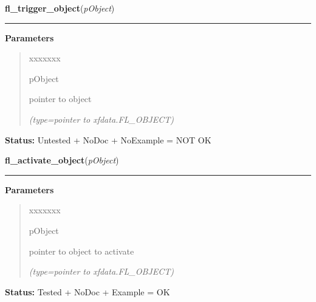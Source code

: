 \hspace{.8\funcindent}\begin{boxedminipage}{\funcwidth}

    \raggedright \textbf{fl\_trigger\_object}(\textit{pObject})

    \vspace{-1.5ex}

    \rule{\textwidth}{0.5\fboxrule}
\setlength{\parskip}{2ex}
\setlength{\parskip}{1ex}
      \textbf{Parameters}
      \vspace{-1ex}

      \begin{quote}
        \begin{Ventry}{xxxxxxx}

          \item[pObject]

          pointer to object

            {\it (type=pointer to xfdata.FL\_OBJECT)}

        \end{Ventry}

      \end{quote}

\textbf{Status:} Untested + NoDoc + NoExample = NOT OK



    \end{boxedminipage}

    \label{xformslib:library:fl_activate_object}

    \vspace{0.5ex}

\hspace{.8\funcindent}\begin{boxedminipage}{\funcwidth}

    \raggedright \textbf{fl\_activate\_object}(\textit{pObject})

    \vspace{-1.5ex}

    \rule{\textwidth}{0.5\fboxrule}
\setlength{\parskip}{2ex}
\setlength{\parskip}{1ex}
      \textbf{Parameters}
      \vspace{-1ex}

      \begin{quote}
        \begin{Ventry}{xxxxxxx}

          \item[pObject]

          pointer to object to activate

            {\it (type=pointer to xfdata.FL\_OBJECT)}

        \end{Ventry}

      \end{quote}

\textbf{Status:} Tested + NoDoc + Example = OK



    \end{boxedminipage}

